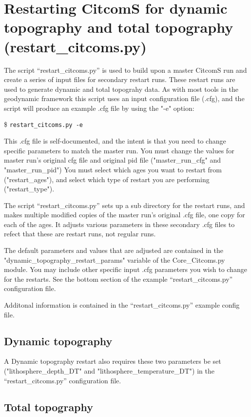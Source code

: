 \documentclass[letterpaper,12pt]{article}
\newcommand{\tm}[1]{\$ \texttt{#1}}
\begin{document}
\section{Restarting CitcomS for dynamic topography and total topography (restart\_citcoms.py)}
The script ``restart\_citcoms.py'' is used to build upon a master CitcomS run and create a series of input files for secondary restart runs.  These restart runs are used to generate dynamic and total topograhy data.  As with most tools in the geodynamic framework this script uses an input configuration file (.cfg), and the script will produce an example .cfg file by using the "-e" option:

\tm{restart\_citcoms.py -e}

This .cfg file is self-documented, and the intent is that you need to change specific parameters to match the master run.
You must change the values for master run's original cfg file and original pid file ("master\_run\_cfg" and "master\_run\_pid")
You must select which ages you want to restart from ("restart\_ages"),
and select which type of restart you are performing ("restart\_type").

The script ``restart\_citcoms.py'' sets up a sub directory for the restart runs, and makes multiple modified copies of the master run's original .cfg file, one copy for each of the ages.
It adjusts various parameters in these secondary .cfg files to refect that these are restart runs, not regular runs.

The default parameters and values that are adjusted are contained in the "dynamic\_topography\_restart\_params" variable of the Core\_Citcoms.py module.
You may include other specific input .cfg parameters you wish to change for the restarts.  See the bottom section of the example ``restart\_citcoms.py'' configuration file.

Additonal information is contained in the ``restart\_citcoms.py'' example config file.

\subsection{Dynamic topography}

A Dynamic topography restart also requires these two parameters be set ("lithosphere\_depth\_DT" and "lithosphere\_temperature\_DT") in the ``restart\_citcoms.py'' configuration file.

\subsection{Total topography}
\end{document}
